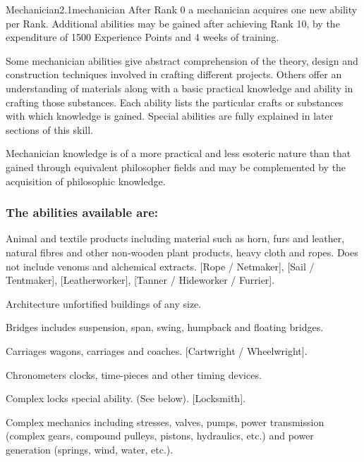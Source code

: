 \begin{skill}{Mechanician}{2.1}{mechanician}
After Rank 0 a mechanician acquires one new ability per Rank.
Additional abilities may be gained after achieving Rank 10, by the
expenditure of 1500 Experience Points and 4 weeks of training.

Some mechanician abilities give abstract comprehension of the theory,
design and construction techniques involved in crafting different
projects. Others offer an understanding of materials along with a
basic practical knowledge and ability in crafting those substances.
Each ability lists the particular crafts or substances with which
knowledge is gained. Special abilities are fully explained in later
sections of this skill.

Mechanician knowledge is of a more practical and less esoteric nature
than that gained through equivalent philosopher fields and may be
complemented by the acquisition of philosophic knowledge.

\subsubsection{The abilities available are:}

\begin{Description}
\item[Animal and textile products]
including material such as horn, furs and leather, natural fibres and
other non-wooden plant products, heavy cloth and ropes. Does not
include venoms and alchemical extracts. [Rope / Netmaker],
[Sail / Tentmaker], [Leatherworker], [Tanner / Hideworker / Furrier].

\item[Architecture]
unfortified buildings of any size.

\item[Bridges]
includes suspension, span, swing, humpback and floating bridges.

\item[Carriages]
wagons, carriages and coaches. [Cartwright / Wheelwright].

\item[Chronometers]
clocks, time-pieces and other timing devices.

\item[Complex locks]
special ability. (See below). [Locksmith].

\item[Complex mechanics]
including stresses, valves, pumps, power transmission (complex gears,
compound pulleys, pistons, hydraulics, etc.) and power generation
(springs, wind, water, etc.).


\end{Description}
\end{skill}

